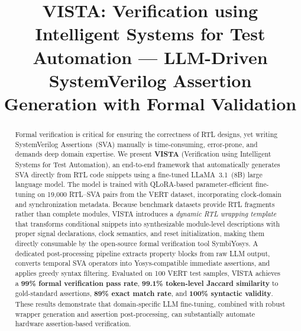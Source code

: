 \documentclass[conference]{IEEEtran}
\begin{document}
\title{VISTA: Verification using Intelligent Systems for Test Automation --- LLM-Driven SystemVerilog Assertion Generation with Formal Validation}

\author{
}

\maketitle

\begin{abstract}
Formal verification is critical for ensuring the correctness of RTL designs, yet writing SystemVerilog Assertions~(SVA) manually is time-consuming, error-prone, and demands deep domain expertise. We present \textbf{VISTA} (Verification using Intelligent Systems for Test Automation), an end-to-end framework that automatically generates SVA directly from RTL code snippets using a fine-tuned LLaMA~3.1~(8B) large language model. The model is trained with QLoRA-based parameter-efficient fine-tuning on 19{,}000 RTL--SVA pairs from the VERT dataset, incorporating clock-domain and synchronization metadata. Because benchmark datasets provide RTL fragments rather than complete modules, VISTA introduces a \emph{dynamic RTL wrapping template} that transforms conditional snippets into synthesizable module-level descriptions with proper signal declarations, clock semantics, and reset initialization, making them directly consumable by the open-source formal verification tool SymbiYosys. A dedicated post-processing pipeline extracts property blocks from raw LLM output, converts temporal SVA operators into Yosys-compatible immediate assertions, and applies greedy syntax filtering. Evaluated on 100 VERT test samples, VISTA achieves a \textbf{99\% formal verification pass rate}, \textbf{99.1\% token-level Jaccard similarity} to gold-standard assertions, \textbf{89\% exact match rate}, and \textbf{100\% syntactic validity}. These results demonstrate that domain-specific LLM fine-tuning, combined with robust wrapper generation and assertion post-processing, can substantially automate hardware assertion-based verification.
\end{abstract}
\end{document}
